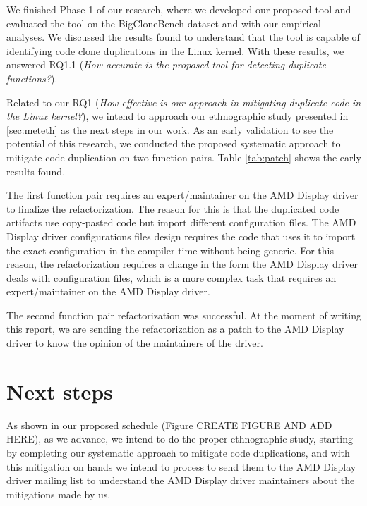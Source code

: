 \en

We finished Phase 1 of our research, where we developed our proposed tool and 
evaluated the tool on the BigCloneBench dataset and with our empirical analyses. 
We discussed the results found to understand that the tool is capable of identifying 
code clone duplications in the Linux kernel. With these results, we answered RQ1.1 
(\textit{How accurate is the proposed tool for detecting duplicate functions?}).

Related to our RQ1
(\textit{How effective is our approach in mitigating duplicate code in the Linux kernel?}),
we intend to approach our ethnographic study presented in \ref{sec:meteth} as the next steps 
in our work. As an early validation to see the potential of this research, we conducted the 
proposed systematic approach to mitigate code duplication on two function pairs. Table
\ref{tab:patch} shows the early results found.




The first function pair requires an expert/maintainer on the AMD Display driver to finalize 
the refactorization. The reason for this is that the duplicated code artifacts use 
copy-pasted code but import different configuration files. The AMD Display driver 
configurations files design requires the code that uses it to import the exact configuration 
in the compiler time without being generic. For this reason, the refactorization requires 
a change in the form the AMD Display driver deals with configuration files, which is a more 
complex task that requires an expert/maintainer on the AMD Display driver.

The second function pair refactorization was successful. At the moment of writing this 
report, we are sending the refactorization as a patch to the AMD Display driver to know 
the opinion of the maintainers of the driver.

\section{Next steps}

As shown in our proposed schedule (Figure CREATE FIGURE AND ADD HERE), as we advance, 
we intend to do the proper ethnographic study, starting by completing our systematic 
approach to mitigate code duplications, and with this mitigation on hands we intend 
to process to send them to the AMD Display driver mailing list to understand the 
AMD Display driver maintainers about the mitigations made by us.
